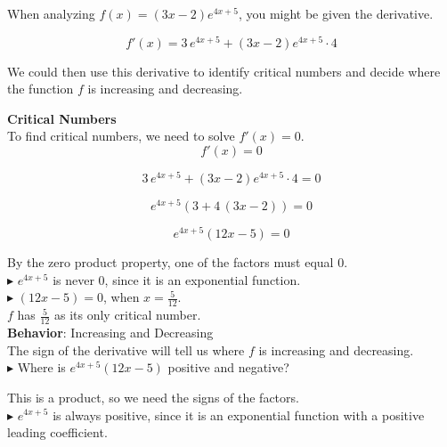 \documentclass{ximera}
\begin{document}
\begin{example}

When analyzing $f(x) = (3x - 2) e^{4x + 5}$, you might be given the derivative.


\[
f'(x) = 3 \, e^{4x + 5} + (3x - 2) e^{4x + 5} \cdot 4
\]


We could then use this derivative to identify critical numbers and decide where the function $f$ is increasing and decreasing.




\textbf{Critical Numbers} \\


To find critical numbers, we need to solve $f'(x) = 0$. \\


\[
f'(x) = 0
\]


\[
3 \, e^{4x + 5} + (3x - 2) e^{4x + 5} \cdot 4 = 0
\]


\[
e^{4x + 5}  (3 + 4 \, (3x - 2)) = 0
\]


\[
e^{4x + 5}  (12x - 5) = 0
\]



By the zero product property, one of the factors must equal $0$. \\



$\blacktriangleright$ $e^{4x + 5}$ is never $0$, since it is an exponential function. \\


$\blacktriangleright$ $(12x - 5) = 0$, when $x = \frac{5}{12}$. \\



$f$ has $\frac{5}{12}$ as its only critical number. \\




\textbf{Behavior}: Increasing and Decreasing \\



The sign of the derivative will tell us where $f$ is increasing and decreasing. \\


\textbf{\textcolor{blue!55!black}{$\blacktriangleright$}} Where is $e^{4x + 5}  (12x - 5)$ positive and negative?


This is a product, so we need the signs of the factors. \\


$\blacktriangleright$  $e^{4x + 5}$ is always positive, since it is an exponential function with a positive leading coefficient. \\



\end{example}
\end{document}
